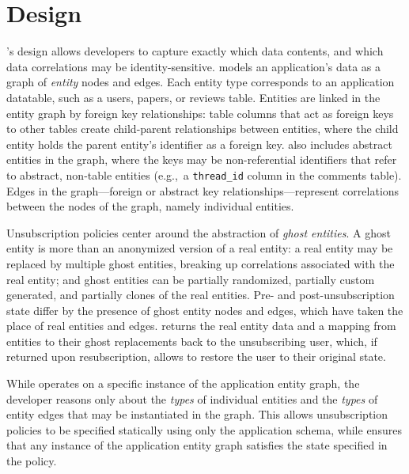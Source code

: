 \section{Design}
\sys's design allows developers to capture exactly which data contents, and which data correlations may be
identity-sensitive. \sys models an application's data as a graph of \emph{entity} nodes and edges.
Each entity type corresponds to an application datatable, such as a users, papers, or reviews table.
Entities are linked in the entity graph by foreign key relationships: table columns that act as
foreign keys to other tables create child-parent relationships between entities, where the child
entity holds the parent entity's identifier as a foreign key. \sys also includes
abstract entities in the graph, where the keys may be non-referential identifiers that refer to
abstract, non-table entities (e.g.,\ a \texttt{thread\_id} column in the comments table).  Edges in
the graph---foreign or abstract key relationships---represent correlations between the nodes of the
graph, namely individual entities.

Unsubscription policies center around the abstraction of \emph{ghost entities}. A ghost entity is
more than an anonymized version of a real entity: a real entity may be replaced by multiple ghost
entities, breaking up correlations associated with the real entity; and ghost entities can be
partially randomized, partially custom generated, and partially clones of the real entities. 
Pre- and post-unsubscription state differ by the presence of ghost entity nodes and edges, which
have taken the place of real entities and edges. \sys returns the real entity data and a mapping
from entities to their ghost replacements back to the unsubscribing user, which, if returned upon
resubscription, allows \sys to restore the user to their original state.

While \sys operates on a specific instance of the application entity graph, the developer reasons
only about the \emph{types} of individual entities and the \emph{types} of entity edges that may be
instantiated in the graph. This allows unsubscription policies to be specified statically using only
the application schema, while \sys ensures that any instance of the application entity graph
satisfies the state specified in the policy.

